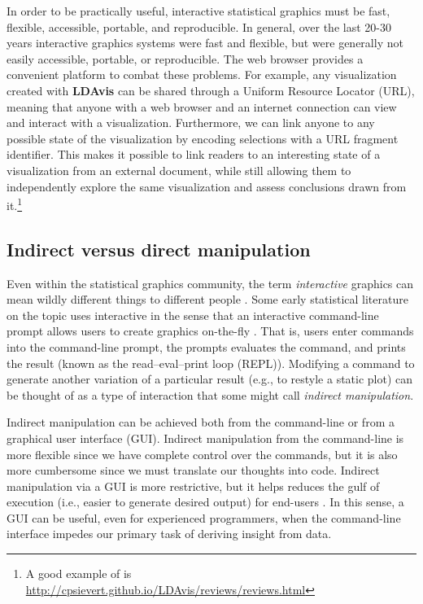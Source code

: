 \documentclass[11pt]{isuthesis}
\begin{document}
In order to be practically useful, interactive statistical graphics must
be fast, flexible, accessible, portable, and reproducible. In general,
over the last 20-30 years interactive graphics systems were fast and
flexible, but were generally not easily accessible, portable, or
reproducible. The web browser provides a convenient platform to combat
these problems. For example, any visualization created with
\textbf{LDAvis} can be shared through a Uniform Resource Locator (URL),
meaning that anyone with a web browser and an internet connection can
view and interact with a visualization. Furthermore, we can link anyone
to any possible state of the visualization by encoding selections with a
URL fragment identifier. This makes it possible to link readers to an
interesting state of a visualization from an external document, while
still allowing them to independently explore the same visualization and
assess conclusions drawn from it.\footnote{A good example of is
  \url{http://cpsievert.github.io/LDAvis/reviews/reviews.html}}

\subsection{Indirect versus direct
manipulation}\label{indirect-versus-direct-manipulation}

Even within the statistical graphics community, the term
\emph{interactive} graphics can mean wildly different things to
different people \citep{swayne-klinke}. Some early statistical
literature on the topic uses interactive in the sense that an
interactive command-line prompt allows users to create graphics
on-the-fly \citep{S:1984}. That is, users enter commands into the
command-line prompt, the prompts evaluates the command, and prints the
result (known as the read--eval--print loop (REPL)). Modifying a command
to generate another variation of a particular result (e.g., to restyle a
static plot) can be thought of as a type of interaction that some might
call \emph{indirect manipulation}.

Indirect manipulation can be achieved both from the command-line or from
a graphical user interface (GUI). Indirect manipulation from the
command-line is more flexible since we have complete control over the
commands, but it is also more cumbersome since we must translate our
thoughts into code. Indirect manipulation via a GUI is more restrictive,
but it helps reduces the gulf of execution (i.e., easier to generate
desired output) for end-users \citep{Hutchins:1985wu}. In this sense, a
GUI can be useful, even for experienced programmers, when the
command-line interface impedes our primary task of deriving insight from
data.
\end{document}
